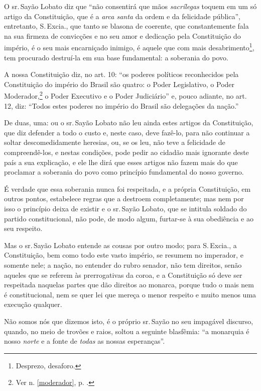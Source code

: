 O sr.\,Sayão Lobato diz que ``não consentirá que mãos \emph{sacrílegas}
toquem em um só artigo da Constituição, que é a \emph{arca santa} da
ordem e da felicidade pública'', entretanto, S.\,Excia., que tanto se
blasona de coerente, que constantemente fala na sua firmeza de
convicções e no seu amor e dedicação pela Constituição do império, é o
seu mais encarniçado inimigo, é aquele que com mais
desabrimento\footnote{Desprezo, desaforo.}, tem procurado destruí-la
em sua base fundamental: a soberania do povo.

A nossa Constituição diz, no art. 10: ``os poderes políticos reconhecidos
pela Constituição do império do Brasil são quatro: o Poder Legislativo,
o Poder Moderador,\footnote{Ver n. \ref{moderador}, p. \pageref{moderador}.} 
o Poder Executivo e o Poder Judiciário'' e, pouco adiante, no art. 12, diz: 
``Todos estes poderes no império do Brasil são delegações da nação.''

De duas, uma: ou o sr.\,Sayão Lobato não leu ainda estes artigos da
Constituição, que diz defender a todo o custo e, neste caso, deve
fazê-lo, para não continuar a soltar descomedidamente heresias, ou, se
os leu, não teve a felicidade de compreendê-los, e nestas condições,
pode pedir ao cidadão mais ignorante deste país a sua explicação, e ele
lhe dirá que esses artigos não fazem mais do que proclamar a soberania
do povo como princípio fundamental do nosso governo.

É verdade que essa soberania nunca foi respeitada, e a própria
Constituição, em outros pontos, estabelece regras que a destroem
completamente; mas nem por isso o princípio deixa de existir e o sr.\,Sayão Lobato, que se intitula soldado do partido constitucional, não
pode, de modo algum, furtar-se à sua obediência e ao seu respeito.

Mas o sr.\,Sayão Lobato entende as cousas por outro modo; para S.\,Excia.,
a Constituição, bem como todo este vasto império, se resumem no
imperador, e somente nele; a nação, no entender do rubro senador, não
tem direitos, senão aqueles que se referem às prerrogativas da coroa, e
a Constituição só deve ser respeitada naquelas partes que dão direitos
ao monarca, porque tudo o mais nem é constitucional, nem se quer lei que
mereça o menor respeito e muito menos uma execução qualquer.

Não somos nós que dizemos isto, é o próprio sr.\,Sayão no seu impagável
discurso, quando, no meio de trovões e raios, soltou a seguinte
blasfêmia: ``a monarquia é nosso \emph{norte} e a fonte de \emph{todas}
as nossas esperanças''.

